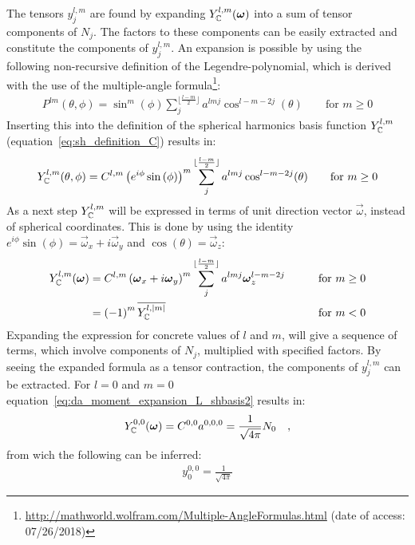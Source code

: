 The tensors $y^{l,m}_j$ are found by expanding $Y_{\mathbb{C}}^{l,m}(\boldsymbol{\mathbf{\omega}})$ into a sum of tensor components of $N_j$. The factors to these components can be easily extracted and constitute the components of $y^{l,m}_j$. An expansion is possible by using the following non-recursive definition of the Legendre-polynomial, which is derived with the use of the multiple-angle formula\footnote{\url{http://mathworld.wolfram.com/Multiple-AngleFormulas.html} (date of access: 07/26/2018)}:
\begin{align}
P^{lm}(\theta, \phi) = \operatorname{sin}^m(\phi)\sum_j^{\lfloor\frac{l-m}{2}\rfloor}a^{lmj}\operatorname{cos}^{l-m-2j}(\theta)
\qquad \text{for } m \ge 0
\end{align}
Inserting this into the definition of the spherical harmonics basis function $Y_{\mathbb{C}}^{l,m}$ (equation~\ref{eq:sh_definition_C}) results in:
\begin{align}
Y_{\mathbb{C}}^{l,m}(\theta, \phi) = C^{l,m}\left(e^{i\phi}\operatorname{sin}\left(\phi\right)\right)^m \sum_j^{\lfloor\frac{l-m}{2}\rfloor}a^{lmj}\operatorname{cos}^{l-m-2j}(\theta)
\qquad \text{for } m \ge 0
\end{align}
As a next step $Y_{\mathbb{C}}^{l,m}$ will be expressed in terms of unit direction vector $\vec{\omega}$, instead of spherical coordinates. This is done by using the identity $e^{i\phi}\operatorname{sin}\left(\phi\right) = \vec{\omega}_x + i\vec{\omega}_y$ and $\operatorname{cos}(\theta) = \vec{\omega}_z$:
\begin{align}
Y_{\mathbb{C}}^{l,m}(\boldsymbol{\mathbf{\omega}}) &=  C^{l,m}\left( \boldsymbol{\mathbf{\omega}}_x + i\boldsymbol{\mathbf{\omega}}_y\right)^m \sum_j^{\lfloor\frac{l-m}{2}\rfloor}a^{lmj}\boldsymbol{\mathbf{\omega}}_z^{l-m-2j}
&\qquad \text{for } m \ge 0
\label{eq:da_moment_expansion_L_shbasis2}
\\
&= \left(-1\right)^m\overline{Y_{\mathbb{C}}^{l,\left\vert m\right\vert}}
&\qquad \text{for } m < 0
\end{align}
Expanding the expression for concrete values of $l$ and $m$, will give a sequence of terms, which involve components of $N_j$, multiplied with specified factors. By seeing the expanded formula as a tensor contraction, the components of $y^{l,m}_j$ can be extracted. For $l=0$ and $m=0$ equation~\ref{eq:da_moment_expansion_L_shbasis2} results in:
\begin{align}
Y_{\mathbb{C}}^{0,0}(\boldsymbol{\mathbf{\omega}}) = C^{{0,0}}a^{{0,0,0}} = \frac{1}{\sqrt{4\pi}}N_0\quad,
\end{align}
from wich the following can be inferred:
\begin{align}
y^{0,0}_0 = \frac{1}{\sqrt{4\pi}}
\end{align}
